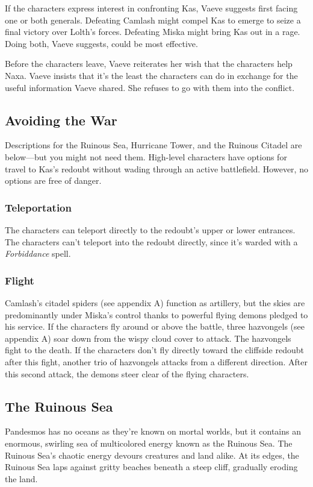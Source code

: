 \documentclass[10pt,a4paper,twoside,bg=print,twocolumn,openany,nodeprecatedcode]{dndbook}
\begin{document}
If the characters express interest in confronting Kas, Vaeve suggests first facing one or both generals. Defeating Camlash might compel Kas to emerge to seize a final victory over Lolth's forces. Defeating Miska might bring Kas out in a rage. Doing both, Vaeve suggests, could be most effective.

Before the characters leave, Vaeve reiterates her wish that the characters help Naxa. Vaeve insists that it's the least the characters can do in exchange for the useful information Vaeve shared. She refuses to go with them into the conflict.

\subsection{Avoiding the War}
Descriptions for the Ruinous Sea, Hurricane Tower, and the Ruinous Citadel are below—but you might not need them. High-level characters have options for travel to Kas's redoubt without wading through an active battlefield. However, no options are free of danger.

\subsubsection{Teleportation}
The characters can teleport directly to the redoubt's upper or lower entrances. The characters can't teleport into the redoubt directly, since it's warded with a \textit{Forbiddance} spell.

\subsubsection{Flight}
Camlash's citadel spiders (see appendix A) function as artillery, but the skies are predominantly under Miska's control thanks to powerful flying demons pledged to his service. If the characters fly around or above the battle, three hazvongels (see appendix A) soar down from the wispy cloud cover to attack. The hazvongels fight to the death. If the characters don't fly directly toward the cliffside redoubt after this fight, another trio of hazvongels attacks from a different direction. After this second attack, the demons steer clear of the flying characters.

\subsection{The Ruinous Sea}
Pandesmos has no oceans as they're known on mortal worlds, but it contains an enormous, swirling sea of multicolored energy known as the Ruinous Sea. The Ruinous Sea's chaotic energy devours creatures and land alike. At its edges, the Ruinous Sea laps against gritty beaches beneath a steep cliff, gradually eroding the land.
\end{document}
